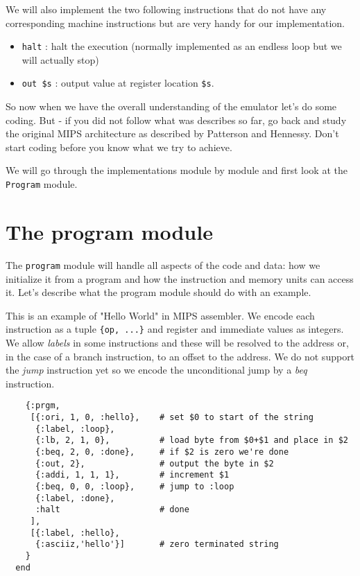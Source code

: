 \documentclass[a4paper,11pt]{article}
\begin{document}
We will also implement the two following instructions that do not
have any corresponding machine instructions but are very handy for our
implementation.

\begin{itemize}
\item {\tt halt} : halt the execution (normally implemented as an endless loop but we will actually stop)
\item {\tt out \$s} : output value at register location {\tt \$s}.
\end{itemize}

So now when we have the overall understanding of the emulator let's do
some coding. But - if you did not follow what was describes so far, go
back and study the original MIPS architecture as described by
Patterson and Hennessy. Don't start coding before you know what we try
to achieve.

We will go through the implementations module by module and first look
at the {\tt Program} module.


\section{The program module}

The {\tt program} module will handle all aspects of the code and data:
how we initialize it from a program and how the instruction and memory
units can access it. Let's describe what the program module should do
with an example.

This is an example of "Hello World" in MIPS assembler. We encode each
instruction as a tuple {\tt \{op, ...\}} and register and immediate
values as integers. We allow {\em labels} in some instructions and
these will be resolved to the address or, in the case of a branch
instruction, to an offset to the address. We do not support
the {\em jump} instruction yet so we encode the unconditional jump by
a {\em beq} instruction. 

\begin{verbatim}
    {:prgm, 
     [{:ori, 1, 0, :hello},    # set $0 to start of the string
      {:label, :loop},
      {:lb, 2, 1, 0},          # load byte from $0+$1 and place in $2
      {:beq, 2, 0, :done},     # if $2 is zero we're done
      {:out, 2},               # output the byte in $2
      {:addi, 1, 1, 1},        # increment $1 
      {:beq, 0, 0, :loop},     # jump to :loop
      {:label, :done},         
      :halt                    # done
     ],
     [{:label, :hello},
      {:asciiz,'hello'}]       # zero terminated string
    }
  end
\end{verbatim}
\end{document}
